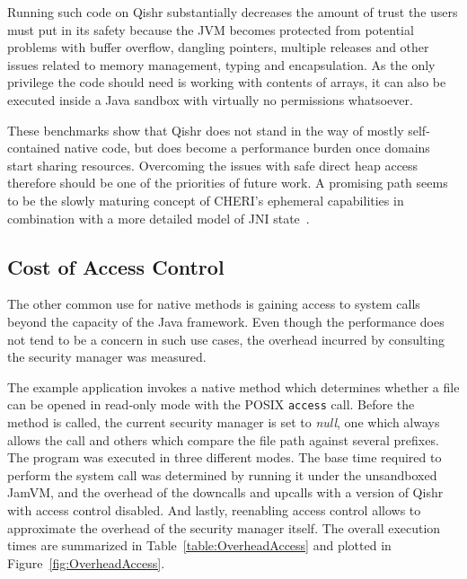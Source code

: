 \documentclass[a4paper,12pt,twoside,openright]{report}
\begin{document}
Running such code on Qishr substantially decreases the amount of trust the users must put in its safety because the JVM becomes protected from potential problems with buffer overflow, dangling pointers, multiple releases and other issues related to memory management, typing and encapsulation. As the only privilege the code should need is working with contents of arrays, it can also be executed inside a Java sandbox with virtually no permissions whatsoever.

These benchmarks show that Qishr does not stand in the way of mostly self-contained native code, but does become a performance burden once domains start sharing resources. Overcoming the issues with safe direct heap access therefore should be one of the priorities of future work. A promising path seems to be the slowly maturing concept of CHERI's ephemeral capabilities in combination with a more detailed model of JNI state~\cite{Tan:2010:JNIFormalModel}. 

\subsection{Cost of Access Control}

The other common use for native methods is gaining access to system calls beyond the capacity of the Java framework. Even though the performance does not tend to be a concern in such use cases, the overhead incurred by consulting the security manager was measured.

The example application invokes a native method which determines whether a file can be opened in read-only mode with the POSIX \texttt{access} call. Before the method is called, the current security manager is set to \emph{null}, one which always allows the call and others which compare the file path against several prefixes. The program was executed in three different modes. The base time required to perform the system call was determined by running it under the unsandboxed JamVM, and the overhead of the downcalls and upcalls with a version of Qishr with access control disabled. And lastly, reenabling access control allows to approximate the overhead of the security manager itself. The overall execution times are summarized in Table~\ref{table:OverheadAccess} and plotted in Figure~\ref{fig:OverheadAccess}.
\end{document}
